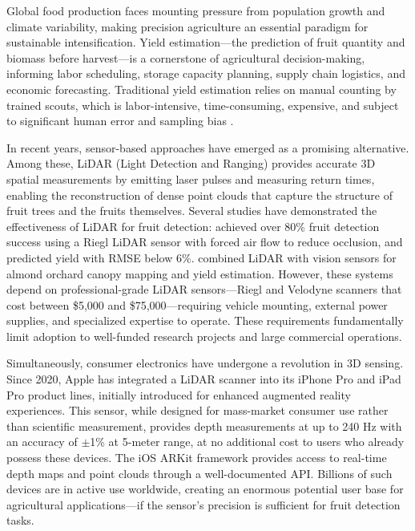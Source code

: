 \documentclass[12pt,a4paper]{article}
\begin{document}
Global food production faces mounting pressure from population growth and climate variability, making precision agriculture an essential paradigm for sustainable intensification. Yield estimation---the prediction of fruit quantity and biomass before harvest---is a cornerstone of agricultural decision-making, informing labor scheduling, storage capacity planning, supply chain logistics, and economic forecasting. Traditional yield estimation relies on manual counting by trained scouts, which is labor-intensive, time-consuming, expensive, and subject to significant human error and sampling bias \citep{gene-mola-2020}.

In recent years, sensor-based approaches have emerged as a promising alternative. Among these, LiDAR (Light Detection and Ranging) provides accurate 3D spatial measurements by emitting laser pulses and measuring return times, enabling the reconstruction of dense point clouds that capture the structure of fruit trees and the fruits themselves. Several studies have demonstrated the effectiveness of LiDAR for fruit detection: \citet{gene-mola-2020} achieved over 80\% fruit detection success using a Riegl LiDAR sensor with forced air flow to reduce occlusion, and predicted yield with RMSE below 6\%. \citet{underwood-2016} combined LiDAR with vision sensors for almond orchard canopy mapping and yield estimation. However, these systems depend on professional-grade LiDAR sensors---Riegl and Velodyne scanners that cost between \$5,000 and \$75,000---requiring vehicle mounting, external power supplies, and specialized expertise to operate. These requirements fundamentally limit adoption to well-funded research projects and large commercial operations.

Simultaneously, consumer electronics have undergone a revolution in 3D sensing. Since 2020, Apple has integrated a LiDAR scanner into its iPhone Pro and iPad Pro product lines, initially introduced for enhanced augmented reality experiences. This sensor, while designed for mass-market consumer use rather than scientific measurement, provides depth measurements at up to 240 Hz with an accuracy of $\pm$1\% at 5-meter range, at no additional cost to users who already possess these devices. The iOS ARKit framework provides access to real-time depth maps and point clouds through a well-documented API. Billions of such devices are in active use worldwide, creating an enormous potential user base for agricultural applications---if the sensor's precision is sufficient for fruit detection tasks.
\end{document}
